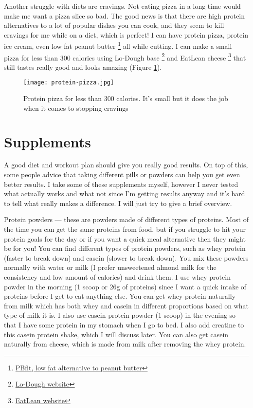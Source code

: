 \documentclass[openany, 12pt]{book}
\begin{document}
        Another struggle with diets are cravings. Not eating pizza in a long time would make me want a pizza slice so bad. The good news is that there are high protein
        alternatives to a lot of popular dishes you can cook, and they seem to kill cravings for me while on a diet, which is perfect! I can have protein pizza, protein
        ice cream, even low fat peanut butter
        \footnote{\href{https://pbfit.com/}{PBfit, low fat alternative to peanut butter}} all while cutting. I can make a small pizza for less than 300 calories using Lo-Dough base
        \footnote{\href{https://lodough.co/}{Lo-Dough website}} and EatLean cheese
        \footnote{\href{https://eatlean.com/}{EatLean website}} that still tastes really
        good and looks amazing (Figure \ref{fig7}).
        
	\begin{figure}[h]
		\centering
		\texttt{[image: protein-pizza.jpg]}
		\caption{Protein pizza for less than 300 calories. It's small but it does the job when it comes to stopping cravings}
		\label{fig7}
	\end{figure}

        \section{Supplements}

        A good diet and workout plan should give you really good results. On top of this, some people advice that taking different pills or powders can help you get even better results.
        I take some of these supplements myself, however I never tested what actually works and what not since I'm getting results anyway and it's hard to tell what really makes a difference.
        I will just try to give a brief overview.

        Protein powders --- these are powders made of different types of proteins. Most of the time you can get the same proteins from food, but if you struggle to hit your protein goals for
        the day or if you want a quick meal alternative then they might be for you! You can find different types of protein powders, such as whey protein (faster to break down) and casein
        (slower to break down). You mix these powders normally with water or milk (I prefer unsweetened almond milk for the consistency and low amount of calories) and drink them.
        I use whey protein powder in the morning (1 scoop or 26g of proteins) since I want a quick intake of proteins before I get to eat anything else. You can get whey protein naturally
        from milk which has both whey and casein in different proportions based on what type of milk it is. I also use casein protein powder (1 scoop)
        in the evening so that I have some protein in my stomach when I go to bed. I also add creatine to this casein protein shake, which I will discuss later. You can also get casein naturally
        from cheese, which is made from milk after removing the whey protein.
\end{document}
